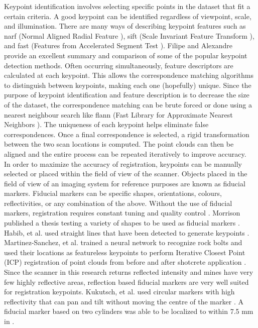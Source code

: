 Keypoint identification involves selecting specific points in the dataset that fit a certain criteria. A good keypoint can be identified regardless of viewpoint, scale, and illumination. There are many ways of describing keypoint features such as \acrshort{narf} (Normal Aligned Radial Feature \cite{narf}), \acrshort{sift} (Scale Invariant Feature Transform \cite{sift}), and \acrshort{fast} (Features from Accelerated Segment Test \cite{fast}). Filipe and Alexandre provide an excellent summary and comparison of some of the popular keypoint detection methods\cite{keypoint}. Often occurring simultaneously, feature descriptors are calculated at each keypoint. This allows the correspondence matching algorithms to distinguish between keypoints, making each one (hopefully) unique. Since the purpose of keypoint identification and feature description is to decrease the size of the dataset, the correspondence matching can be brute forced or done using a nearest neighbour search like \acrshort{flann} (Fast Library for Approximate Nearest Neighbors \cite{flann}). The uniqueness of each keypoint helps eliminate false correspondences. Once a final correspondence is selected, a rigid transformation between the two scan locations is computed. The point clouds can then be aligned and the entire process can be repeated iteratively to improve accuracy.\\

In order to maximize the accuracy of registration, keypoints can be manually selected or placed within the field of view of the scanner. Objects placed in the field of view of an imaging system for reference purposes are known as fiducial markers. Fiducial markers can be specific shapes, orientations, colours, reflectivities, or any combination of the above. Without the use of fiducial markers, registration requires constant tuning and quality control \cite{reg3}. Morrison published a thesis testing a variety of shapes to be used as fiducial markers \cite{mark1}. Habib, et al. used straight lines that have been detected to generate keypoints \cite{key1}. Martinez-Sanchez, et al. trained a neural network to recognize rock bolts and used their locations as featureless keypoints to perform Iterative Closest Point (ICP) registration of point clouds from before and after shotcrete application \cite{reg2}.\\

Since the scanner in this research returns reflected intensity and mines have very few highly reflective areas, reflection based fiducial markers are very well suited for registration keypoints. Kukutsch, et al. used circular markers with high reflectivity that can pan and tilt without moving the centre of the marker \cite{mark2}. A fiducial marker based on two cylinders was able to be localized to within 7.5 mm in \cite{mark3}.\\

